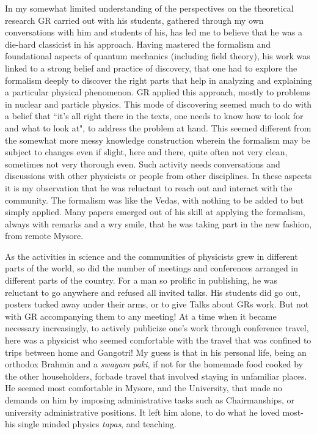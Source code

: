 In my somewhat limited understanding of the perspectives on the theoretical research GR carried out with his students, gathered through my own conversations with him and students of his, has led me to believe that he was a die-hard classicist in his approach. Having mastered the formalism and foundational aspects of quantum mechanics (including field theory), his work was linked to a strong belief and practice of discovery, that one had to explore the formalism deeply to discover the right parts that help in analyzing and explaining a particular physical phenomenon. GR applied this approach, mostly to problems in nuclear and particle physics. This mode of discovering seemed much to do with a belief that ``it's all right there in the texts, one needs to know how to look for and what to look at", to address the problem at hand. This seemed different from the somewhat more messy knowledge construction wherein the formalism may be subject to changes even if slight, here and there, quite often not very clean, sometimes not very thorough even. Such activity needs conversations and discussions with other physicists or people from other disciplines. In these aspects it is my observation that he was reluctant to reach out and interact with the community. The formalism was like the Vedas, with nothing to be added to but simply applied. Many papers emerged out of his skill at applying the formalism, always with remarks and a wry smile, that he was taking part in the new fashion, from remote Mysore.

As the activities in science and the communities of physicists grew in different parts of the world, so did the number of meetings and conferences arranged in different parts of the country. For a man so prolific in publishing, he was reluctant to go anywhere and refused all invited talks. His students did go out, posters tucked away under their arms, or to give Talks about GRs work. But not with GR accompanying them to any meeting! At a time when it became necessary increasingly, to actively publicize one's work through conference travel, here was a physicist who seemed comfortable with the travel that was confined to trips between home and Gangotri!  My guess is that in his personal life, being an orthodox Brahmin and a \textit{swayam paki}, if not for the homemade food cooked by the other householders, forbade travel that involved staying in unfamiliar places. He seemed most comfortable in Mysore, and the University, that made no demands on him by imposing administrative tasks such as Chairmanships, or university administrative positions. It left him alone, to do what he loved most-his single minded physics \textit{tapas}, and teaching.
\vspace{.2cm}

